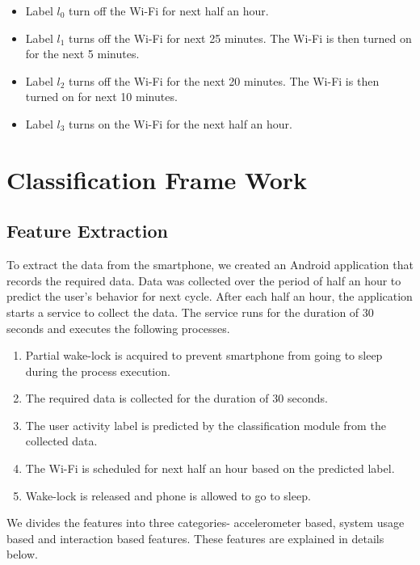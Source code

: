 \begin{itemize}
\item Label $l_0$ turn off the Wi-Fi for next half an hour.
\item Label $l_1$ turns off the Wi-Fi for next 25 minutes. The Wi-Fi is then turned on for the next 5 minutes.
\item Label $l_2$ turns off the Wi-Fi for the next 20 minutes. The Wi-Fi is then turned on for next 10 minutes.
\item Label $l_3$ turns on the Wi-Fi for the next half an hour.
\end{itemize} 
\begin{center}
\begin{figure}[!ht]
\end{figure}
\end{center}

\section{Classification Frame Work}

\subsection{Feature Extraction}
\label{sec:Features}

To extract the data from the smartphone, we created an
Android application that records the required data.
Data was collected over the period of half an hour to
predict the user’s behavior for next cycle. After each
half an hour, the application starts a service to collect the data.
The service runs for the duration of 30 seconds and executes
the following processes.


\begin{enumerate}
\item Partial wake-lock is acquired to prevent smartphone from going to sleep during the process execution.
\item The required data is collected for the duration of 30 seconds.
\item The user activity label is predicted by the classification module from the collected data. 
\item The Wi-Fi is scheduled for next half an hour based on the predicted label. 
\item Wake-lock is released and phone is allowed to go to sleep.
\end{enumerate}
We divides the features into three categories- accelerometer based, system usage based and interaction based features. These features are explained in details below. 
 
